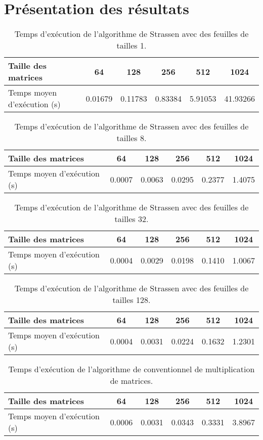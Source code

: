 \documentclass[a4paper, 12pt]{article} %
\begin{document}
\section{Présentation des résultats}
\begin{table}[H]
\caption{Temps d'exécution de l'algorithme de Strassen avec des feuilles de tailles 1.}
\centering
    \begin{tabular}{| l | c | c | c | c | c |}
    \hline
    Taille des matrices & 64 & 128 & 256 & 512 & 1024 \\
    \hline  
    Temps moyen d'exécution (s) & 0.01679 & 0.11783 & 0.83384 & 5.91053 & 41.93266 \\
    \hline  
    \end{tabular}
\end{table}
\begin{table}[H]
    \caption{Temps d'exécution de l'algorithme de Strassen avec des feuilles de tailles 8.}
    \centering
    \begin{tabular}{| l | c | c | c | c | c |}
    \hline    
    Taille des matrices & 64 & 128 & 256 & 512 & 1024 \\
    \hline  
    Temps moyen d'exécution (s) & 0.0007 & 0.0063 & 0.0295 & 0.2377 & 1.4075 \\
    \hline  
    \end{tabular}
\end{table}
\begin{table}[H]
    \caption{Temps d'exécution de l'algorithme de Strassen avec des feuilles de tailles 32.}
    \centering
    \begin{tabular}{| l | c | c | c | c | c |}
    \hline
    Taille des matrices & 64 & 128 & 256 & 512 & 1024 \\
    \hline  
    Temps moyen d'exécution (s) & 0.0004 & 0.0029 & 0.0198 & 0.1410 & 1.0067 \\
    \hline      
    \end{tabular}
\end{table}
\begin{table}[H]
    \caption{Temps d'exécution de l'algorithme de Strassen avec des feuilles de tailles 128.}
    \centering
    \begin{tabular}{| l | c | c | c | c | c |}
    \hline
    Taille des matrices & 64 & 128 & 256 & 512 & 1024 \\
    \hline  
    Temps moyen d'exécution (s) & 0.0004 & 0.0031 & 0.0224 & 0.1632 & 1.2301 \\
    \hline  
    \end{tabular}
\end{table}
\begin{table}[H]
    \caption{Temps d'exécution de l'algorithme de conventionnel de multiplication de matrices.}
    \centering
    \begin{tabular}{| l | c | c | c | c | c |}
    \hline
    Taille des matrices & 64 & 128 & 256 & 512 & 1024 \\
    \hline  
    Temps moyen d'exécution (s) & 0.0006 & 0.0031 & 0.0343 & 0.3331 & 3.8967 \\
    \hline  
    \end{tabular}
\end{table}
\end{document}
